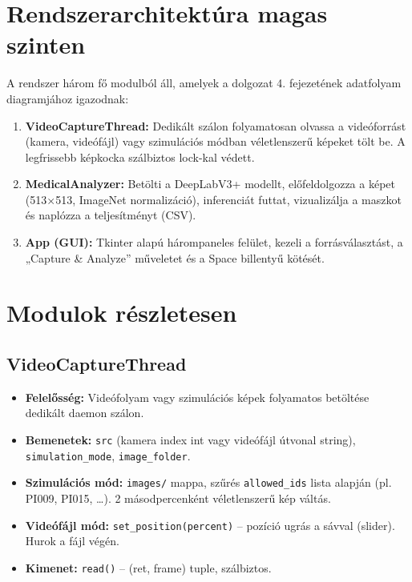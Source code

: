 \section{Rendszerarchitektúra magas szinten}

A rendszer három fő modulból áll, amelyek a dolgozat 4. fejezetének adatfolyam diagramjához igazodnak:

\begin{enumerate}
    \item \textbf{VideoCaptureThread:} Dedikált szálon folyamatosan olvassa a videóforrást (kamera, videófájl) vagy szimulációs módban véletlenszerű képeket tölt be. A legfrissebb képkocka szálbiztos lock-kal védett.
    \item \textbf{MedicalAnalyzer:} Betölti a DeepLabV3+ modellt, előfeldolgozza a képet (513×513, ImageNet normalizáció), inferenciát futtat, vizualizálja a maszkot és naplózza a teljesítményt (CSV).
    \item \textbf{App (GUI):} Tkinter alapú hárompaneles felület, kezeli a forrásválasztást, a „Capture \& Analyze” műveletet és a Space billentyű kötését.
\end{enumerate}

\section{Modulok részletesen}

\subsection{VideoCaptureThread}
\begin{itemize}
    \item \textbf{Felelősség:} Videófolyam vagy szimulációs képek folyamatos betöltése dedikált daemon szálon.
    \item \textbf{Bemenetek:} \texttt{src} (kamera index int vagy videófájl útvonal string), \texttt{simulation\_mode}, \texttt{image\_folder}.
    \item \textbf{Szimulációs mód:} \texttt{images/} mappa, szűrés \texttt{allowed\_ids} lista alapján (pl. PI009, PI015, …). 2 másodpercenként véletlenszerű kép váltás.
    \item \textbf{Videófájl mód:} \texttt{set\_position(percent)} – pozíció ugrás a sávval (slider). Hurok a fájl végén.
    \item \textbf{Kimenet:} \texttt{read()} – (ret, frame) tuple, szálbiztos.
\end{itemize}

